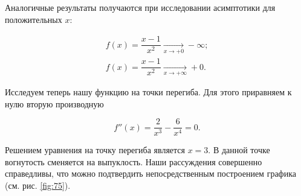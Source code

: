 \documentclass[12pt]{article}
\begin{document}
Аналогичные результаты получаются при исследовании асимптотики для положительных $x$:

\begin{gather} 
f(x) = \dfrac{x - 1}{x^2} \underset{x\rightarrow+0}{\longrightarrow} -\infty; \\ 
f(x) = \dfrac{x - 1}{x^2} \underset{x\rightarrow +\infty}{\longrightarrow} +0.
\end{gather}

Исследуем теперь нашу функцию на точки перегиба. Для этого приравняем к нулю вторую производную

\begin{equation}
	f''(x) = \dfrac{2}{x^3} - \dfrac{6}{x^4} = 0.
\end{equation}

Решением уравнения на точку перегиба является $x=3$. В данной точке вогнутость сменяется на выпуклость. Наши рассуждения совершенно справедливы, что можно подтвердить непосредственным построением графика (см. рис. \ref{fig:75}).
\end{document}
